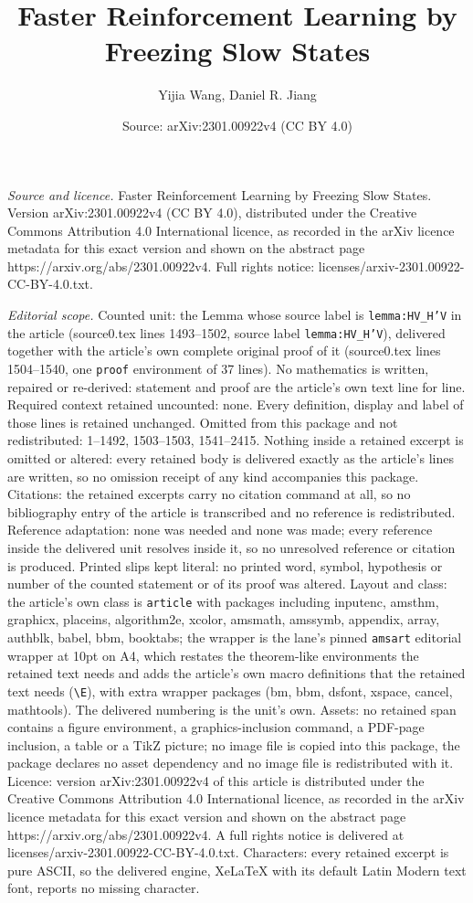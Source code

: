 \documentclass[10pt,a4paper]{amsart}
\title[Faster Reinforcement Learning by Freezing Slow States]{Faster Reinforcement Learning by Freezing Slow States}
\author{Yijia Wang, Daniel R. Jiang}
\date{Source: arXiv:2301.00922v4 (CC BY 4.0)}
\begin{document}
\maketitle

\noindent\emph{Source and licence.} Faster Reinforcement Learning by Freezing Slow States. Version arXiv:2301.00922v4 (CC BY 4.0), distributed under the Creative Commons Attribution 4.0 International licence, as recorded in the arXiv licence metadata for this exact version and shown on the abstract page https://arxiv.org/abs/2301.00922v4. Full rights notice: licenses/arxiv-2301.00922-CC-BY-4.0.txt.\par\smallskip

\noindent\textit{Editorial scope.} Counted unit: the Lemma whose source label is \texttt{lemma:HV\_H'V} in the article (source0.tex lines 1493--1502, source label \texttt{lemma:HV\_H'V}), delivered together with the article's own complete original proof of it (source0.tex lines 1504--1540, one \texttt{proof} environment of 37 lines). No mathematics is written, repaired or re-derived: statement and proof are the article's own text line for line. Required context retained uncounted: none. Every definition, display and label of those lines is retained unchanged. Omitted from this package and not redistributed: 1--1492, 1503--1503, 1541--2415. Nothing inside a retained excerpt is omitted or altered: every retained body is delivered exactly as the article's lines are written, so no omission receipt of any kind accompanies this package. Citations: the retained excerpts carry no citation command at all, so no bibliography entry of the article is transcribed and no reference is redistributed. Reference adaptation: none was needed and none was made; every reference inside the delivered unit resolves inside it, so no unresolved reference or citation is produced. Printed slips kept literal: no printed word, symbol, hypothesis or number of the counted statement or of its proof was altered. Layout and class: the article's own class is \texttt{article} with packages including inputenc, amsthm, graphicx, placeins, algorithm2e, xcolor, amsmath, amssymb, appendix, array, authblk, babel, bbm, booktabs; the wrapper is the lane's pinned \texttt{amsart} editorial wrapper at 10pt on A4, which restates the theorem-like environments the retained text needs and adds the article's own macro definitions that the retained text needs (\texttt{\textbackslash E}), with extra wrapper packages (bm, bbm, dsfont, xspace, cancel, mathtools). The delivered numbering is the unit's own. Assets: no retained span contains a figure environment, a graphics-inclusion command, a PDF-page inclusion, a table or a TikZ picture; no image file is copied into this package, the package declares no asset dependency and no image file is redistributed with it. Licence: version arXiv:2301.00922v4 of this article is distributed under the Creative Commons Attribution 4.0 International licence, as recorded in the arXiv licence metadata for this exact version and shown on the abstract page https://arxiv.org/abs/2301.00922v4. A full rights notice is delivered at licenses/arxiv-2301.00922-CC-BY-4.0.txt. Characters: every retained excerpt is pure ASCII, so the delivered engine, XeLaTeX with its default Latin Modern text font, reports no missing character.
\end{document}
